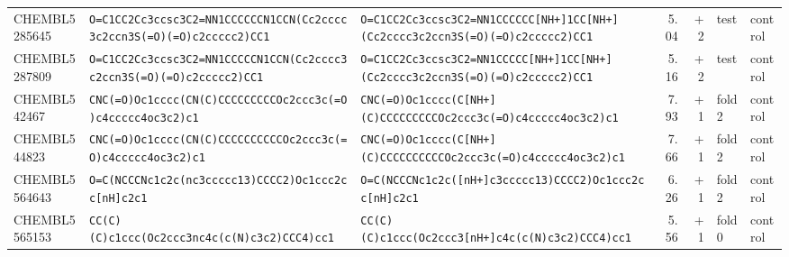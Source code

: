 \begin{longtable}{l p{4.4cm} p{4.4cm} r r l l}
CHEMBL5285645 & \texttt{O=\allowbreak{}C1CC2Cc3ccsc3C2=\allowbreak{}NN1CCCCCCN1CCN(\allowbreak{}Cc2cccc3c2ccn3S(\allowbreak{}=\allowbreak{}O)\allowbreak{}(\allowbreak{}=\allowbreak{}O)\allowbreak{}c2ccccc2)\allowbreak{}CC1} & \texttt{O=\allowbreak{}C1CC2Cc3ccsc3C2=\allowbreak{}NN1CCCCCC[NH+]\allowbreak{}1CC[NH+]\allowbreak{}(\allowbreak{}Cc2cccc3c2ccn3S(\allowbreak{}=\allowbreak{}O)\allowbreak{}(\allowbreak{}=\allowbreak{}O)\allowbreak{}c2ccccc2)\allowbreak{}CC1} & 5.04 & +2 & test & control \\
CHEMBL5287809 & \texttt{O=\allowbreak{}C1CC2Cc3ccsc3C2=\allowbreak{}NN1CCCCCN1CCN(\allowbreak{}Cc2cccc3c2ccn3S(\allowbreak{}=\allowbreak{}O)\allowbreak{}(\allowbreak{}=\allowbreak{}O)\allowbreak{}c2ccccc2)\allowbreak{}CC1} & \texttt{O=\allowbreak{}C1CC2Cc3ccsc3C2=\allowbreak{}NN1CCCCC[NH+]\allowbreak{}1CC[NH+]\allowbreak{}(\allowbreak{}Cc2cccc3c2ccn3S(\allowbreak{}=\allowbreak{}O)\allowbreak{}(\allowbreak{}=\allowbreak{}O)\allowbreak{}c2ccccc2)\allowbreak{}CC1} & 5.16 & +2 & test & control \\
CHEMBL542467 & \texttt{CNC(\allowbreak{}=\allowbreak{}O)\allowbreak{}Oc1cccc(\allowbreak{}CN(\allowbreak{}C)\allowbreak{}CCCCCCCCCOc2ccc3c(\allowbreak{}=\allowbreak{}O)\allowbreak{}c4ccccc4oc3c2)\allowbreak{}c1} & \texttt{CNC(\allowbreak{}=\allowbreak{}O)\allowbreak{}Oc1cccc(\allowbreak{}C[NH+]\allowbreak{}(\allowbreak{}C)\allowbreak{}CCCCCCCCCOc2ccc3c(\allowbreak{}=\allowbreak{}O)\allowbreak{}c4ccccc4oc3c2)\allowbreak{}c1} & 7.93 & +1 & fold 2 & control \\
CHEMBL544823 & \texttt{CNC(\allowbreak{}=\allowbreak{}O)\allowbreak{}Oc1cccc(\allowbreak{}CN(\allowbreak{}C)\allowbreak{}CCCCCCCCCCOc2ccc3c(\allowbreak{}=\allowbreak{}O)\allowbreak{}c4ccccc4oc3c2)\allowbreak{}c1} & \texttt{CNC(\allowbreak{}=\allowbreak{}O)\allowbreak{}Oc1cccc(\allowbreak{}C[NH+]\allowbreak{}(\allowbreak{}C)\allowbreak{}CCCCCCCCCCOc2ccc3c(\allowbreak{}=\allowbreak{}O)\allowbreak{}c4ccccc4oc3c2)\allowbreak{}c1} & 7.66 & +1 & fold 2 & control \\
CHEMBL5564643 & \texttt{O=\allowbreak{}C(\allowbreak{}NCCCNc1c2c(\allowbreak{}nc3ccccc13)\allowbreak{}CCCC2)\allowbreak{}Oc1ccc2cc[nH]\allowbreak{}c2c1} & \texttt{O=\allowbreak{}C(\allowbreak{}NCCCNc1c2c(\allowbreak{}[nH+]\allowbreak{}c3ccccc13)\allowbreak{}CCCC2)\allowbreak{}Oc1ccc2cc[nH]\allowbreak{}c2c1} & 6.26 & +1 & fold 2 & control \\
CHEMBL5565153 & \texttt{CC(\allowbreak{}C)\allowbreak{}(\allowbreak{}C)\allowbreak{}c1ccc(\allowbreak{}Oc2ccc3nc4c(\allowbreak{}c(\allowbreak{}N)\allowbreak{}c3c2)\allowbreak{}CCC4)\allowbreak{}cc1} & \texttt{CC(\allowbreak{}C)\allowbreak{}(\allowbreak{}C)\allowbreak{}c1ccc(\allowbreak{}Oc2ccc3[nH+]\allowbreak{}c4c(\allowbreak{}c(\allowbreak{}N)\allowbreak{}c3c2)\allowbreak{}CCC4)\allowbreak{}cc1} & 5.56 & +1 & fold 0 & control \\

\end{longtable}
